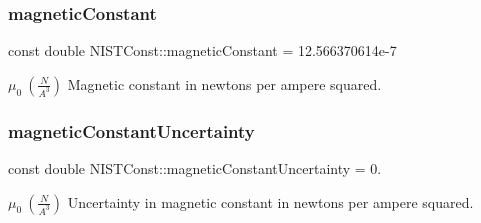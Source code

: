 \subsubsection{\texorpdfstring{magnetic\+Constant}{magneticConstant}}
{\footnotesize\ttfamily const double N\+I\+S\+T\+Const\+::magnetic\+Constant = 12.\+566370614e-\/7}

$\mu_0 \ (\frac{N}{A^3})$ Magnetic constant in newtons per ampere squared. \mbox{\label{group___magnetic_constant_ga17f91f2aa414afe44a0bc84825034a4e}} 
\subsubsection{\texorpdfstring{magnetic\+Constant\+Uncertainty}{magneticConstantUncertainty}}
{\footnotesize\ttfamily const double N\+I\+S\+T\+Const\+::magnetic\+Constant\+Uncertainty = 0.}

$\mu_0 \ (\frac{N}{A^3})$ Uncertainty in magnetic constant in newtons per ampere squared. 